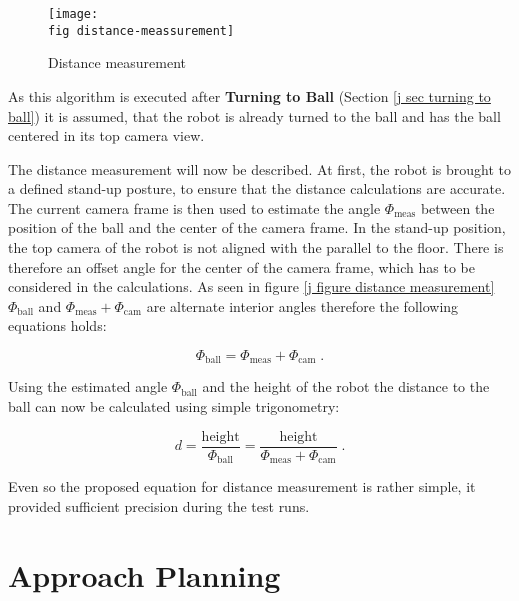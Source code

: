 \begin{figure}[ht]
  \texttt{[image: \\fig distance-meassurement]}
  \caption{Distance measurement}
  \label{j figure distance measurement}
\end{figure}

As this algorithm is executed after \textbf{Turning to Ball} (Section \ref{j
  sec turning to ball}) it is assumed, that the robot is already turned to the
ball and has the ball centered in its top camera view.

The distance measurement will now be described. At first,
the robot is brought to a defined stand-up posture, to ensure that the
distance calculations are accurate. The current camera frame is then
used to estimate the angle $\Phi_{\mathrm{meas}}$ between the position of the
ball and the center of the camera frame. In the stand-up position, the top
camera of the robot is not aligned with the parallel to the floor. There is
therefore an offset angle for the center of the camera frame, which has to be
considered in the calculations. As seen in figure \ref{j figure distance
  measurement} $ \Phi_{\mathrm{ball}} $ and $
\Phi_{\mathrm{meas}}+\Phi_{\mathrm{cam}} $ are alternate interior angles
therefore the following equations holds:

\begin{equation}
  \Phi_{\mathrm{ball}} = \Phi_{\mathrm{meas}}+\Phi_{\mathrm{cam}} \; .
\end{equation}

Using the estimated angle $ \Phi_{\mathrm{ball}} $ and the height of the robot
the distance to the ball can now be calculated using simple trigonometry:

\begin{equation}
  d = \frac{\mathrm{height}}{\Phi_{\mathrm{ball}}} = \frac{\mathrm{height}}{\Phi_{\mathrm{meas}}+\Phi_{\mathrm{cam}}} \; .
\end{equation}

Even so the proposed equation for distance measurement is rather simple, it
provided sufficient precision during the test runs.


\section{Approach Planning}
\label{j sec approach planning}

